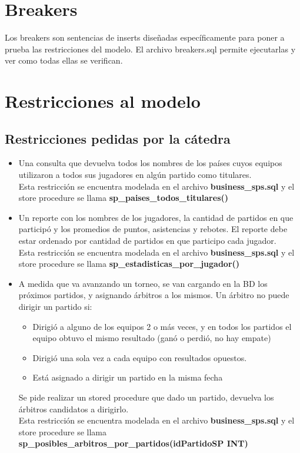 \documentclass[11pt, a4paper, spanish]{article}
\begin{document}
{{{\newpage 
\section{Breakers}

Los breakers son sentencias de inserts dise\~{n}adas espec\'ificamente para poner a prueba las restricciones del modelo.
El archivo breakers.sql permite ejecutarlas y ver como todas ellas se verifican.

\section{Restricciones al modelo}

\subsection{Restricciones pedidas por la c\'atedra}

\begin{itemize}
	\item{Una consulta que devuelva todos los nombres de los pa\'ises cuyos equipos utilizaron a todos sus jugadores en alg\'un partido como titulares.\\
	    	Esta restricci\'on se encuentra modelada en el archivo \textbf{business\_sps.sql} y el store procedure se llama \textbf{sp\_paises\_todos\_titulares()}
	}

	\item{Un reporte con los nombres de los jugadores, la cantidad de partidos en que particip\'o y los promedios de puntos, asistencias y rebotes. 
		El reporte debe estar ordenado por  cantidad de partidos en que participo cada jugador.\\
		Esta restricci\'on se encuentra modelada en el archivo \textbf{business\_sps.sql} y el store procedure se llama \textbf{sp\_estadisticas\_por\_jugador()}
	}

	\item{A medida que va avanzando un torneo, se van cargando en la BD los pr\'oximos
		partidos, y asignando \'arbitros a los mismos. Un \'arbitro no puede dirigir un partido si:
		\begin{itemize}
			\item{Dirigi\'o a alguno de los equipos 2 o m\'as veces, y en todos los partidos el equipo obtuvo el mismo resultado (gan\'o o perdi\'o, no hay empate)}
			\item{Dirigi\'o una sola vez a cada equipo con resultados opuestos.}
			\item{Est\'a asignado a dirigir un partido en la misma fecha}
		\end{itemize}
		Se pide realizar un stored procedure que dado un partido, devuelva los \'arbitros candidatos a dirigirlo. \\
		Esta restricci\'on se encuentra modelada en el archivo \textbf{business\_sps.sql} y el store procedure se llama \textbf{sp\_posibles\_arbitros\_por\_partidos(idPartidoSP INT)}
	}


\end{itemize}}}}
\end{document}
